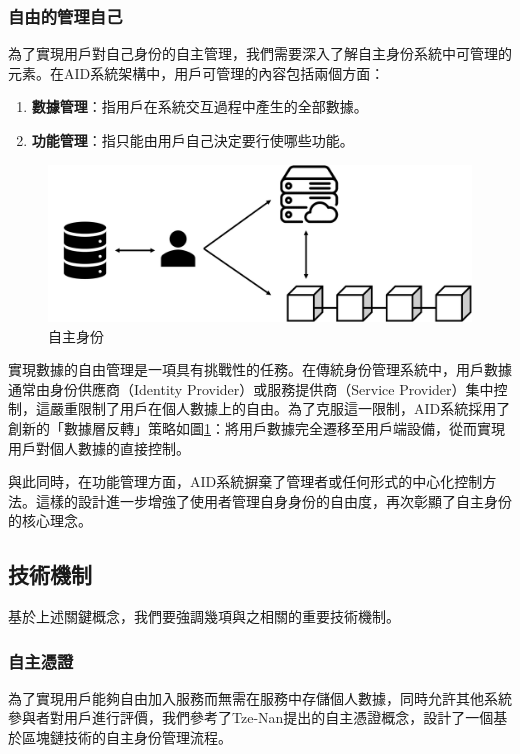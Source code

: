 \subsubsection{自由的管理自己}
為了實現用戶對自己身份的自主管理，我們需要深入了解自主身份系統中可管理的元素。在AID系統架構中，用戶可管理的內容包括兩個方面：
\begin{enumerate}
  \item \textbf{數據管理}：指用戶在系統交互過程中產生的全部數據。
  \item \textbf{功能管理}：指只能由用戶自己決定要行使哪些功能。
\end{enumerate}
\begin{figure}
  \centering
  \includegraphics[width=\linewidth,keepaspectratio]{figures/aid.png}
  \caption{自主身份}
  \label{fig:aid}
\end{figure}
實現數據的自由管理是一項具有挑戰性的任務。在傳統身份管理系統中，用戶數據通常由身份供應商（Identity Provider）或服務提供商（Service Provider）集中控制，這嚴重限制了用戶在個人數據上的自由。為了克服這一限制，AID系統採用了創新的「數據層反轉」策略如圖\ref{fig:aid}：將用戶數據完全遷移至用戶端設備，從而實現用戶對個人數據的直接控制。

與此同時，在功能管理方面，AID系統摒棄了管理者或任何形式的中心化控制方法。這樣的設計進一步增強了使用者管理自身身份的自由度，再次彰顯了自主身份的核心理念。
\subsection{技術機制}
基於上述關鍵概念，我們要強調幾項與之相關的重要技術機制。
\subsubsection{自主憑證}
為了實現用戶能夠自由加入服務而無需在服務中存儲個人數據，同時允許其他系統參與者對用戶進行評價，我們參考了Tze-Nan\cite{NTU202102846}提出的自主憑證概念，設計了一個基於區塊鏈技術的自主身份管理流程。

